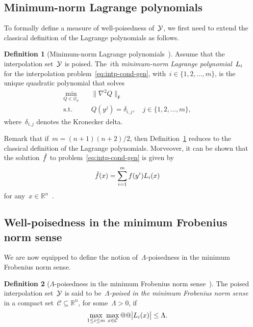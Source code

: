 \documentclass{article}
\numberwithin{equation}{section}
\theoremstyle{definition}
\newtheorem{definition}{Definition}[section]
\theoremstyle{plain}
\theoremstyle{remark}
\newcommand*{\abs}[2][]{#1\lvert#2#1\rvert}
\newcommand*{\lagp}[1][]{L\ifblank{#1}{}{_{#1}}}
\newcommand*{\norm}[2][]{#1\lVert#2#1\rVert}
\newcommand*{\obj}{f}
\newcommand*{\objm}[1][]{\hat{\obj}\ifblank{#1}{}{^{#1}}}
\newcommand*{\qpoly}{\mathcal{Q}_n}
\newcommand*{\R}{\mathbb{R}}
\newcommand*{\set}[2][]{#1\{#2#1\}}
\newcommand*{\xpt}[1][]{\mathcal{Y}\ifblank{#1}{}{^{#1}}}
\begin{document}
\subsection{Minimum-norm Lagrange polynomials}

To formally define a measure of well-poisedness of~$\xpt$, we first need to extend the classical definition of the Lagrange polynomials as follows.

\begin{definition}[Minimum-norm Lagrange polynomials~{\cite[Definition~5.1]{Conn_Scheinberg_Vicente_2009}}]
    \label{def:min-norm-lagp}
    Assume that the interpolation set~$\xpt$ is poised.
    The~$i$th \emph{minimum-norm Lagrange polynomial}~$\lagp[i]$ for the interpolation problem~\eqref{eq:intp-cond-gen}, with~$i \in \set{1, 2, \dots, m}$, is the unique quadratic polynomial that solves
    \begin{equation*}
        \begin{aligned}
            \min_{Q \in \qpoly} & \quad \norm[\big]{\nabla^2 Q}_{\mathsf{F}}\\
            \text{s.t.}         & \quad Q(y^j) = \delta_{i, j}, \quad j \in \set{1, 2, \dots, m},
        \end{aligned}
    \end{equation*}
    where~$\delta_{i, j}$ denotes the Kronecker delta.
\end{definition}

Remark that if~$m = (n + 1) (n + 2) / 2$, then Definition~\ref{def:min-norm-lagp} reduces to the classical definition of the Lagrange polynomials.
Morveover, it can be shown that the solution~$\objm$ to problem~\eqref{eq:intp-cond-gen} is given by
\begin{equation*}
    \objm(x) = \sum_{i = 1}^m \obj(y^i) \lagp[i](x)
\end{equation*}
for any~$x \in \R^n$~\cite[Lemma~5.2]{Conn_Scheinberg_Vicente_2009}.

\subsection{Well-poisedness in the minimum Frobenius norm sense}

We are now equipped to define the notion of~$\Lambda$-poisedness in the minimum Frobenius norm sense.

\begin{definition}[$\Lambda$-poisedness in the minimum Frobenius norm sense~{\cite[Definition~5.6]{Conn_Scheinberg_Vicente_2009}}]
    \label{def:lambda-p}
    The poised interpolation set~$\xpt$ is said to be~\emph{$\Lambda$-poised in the minimum Frobenius norm sense} in a compact set~$\mathcal{C} \subseteq \R^n$, for some~$\Lambda > 0$, if
    \begin{equation*}
        \max_{1 \le i \le m} \max_{x \in \mathcal{C}} @@ \abs[\big]{\lagp[i](x)} \le \Lambda.
    \end{equation*}
\end{definition}
\end{document}
